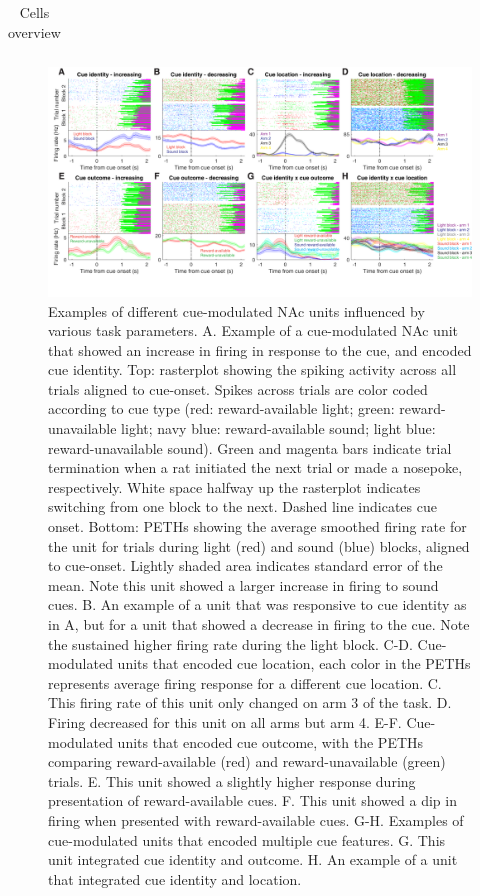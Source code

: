 \documentclass[11pt]{article}
\begin{document}
\begin{table}[p]
\begin{tabular}{l c  c c c c}
\end{tabular}
\caption {Cells overview} \label{tbl1} 
\end{table}

\begin{figure}[h]
\centering
\includegraphics[width=\textwidth]{Fig 5 - Neural examples.png}
\caption{Examples of different cue-modulated NAc units influenced by various task parameters. A. Example of a cue-modulated NAc unit that showed an increase in firing in response to the cue, and encoded cue identity. Top: rasterplot showing the spiking activity across all trials aligned to cue-onset. Spikes across trials are color coded according to cue type (red: reward-available light; green: reward-unavailable light; navy blue: reward-available sound; light blue: reward-unavailable sound). Green and magenta bars indicate trial termination when a rat initiated the next trial or made a nosepoke, respectively. White space halfway up the rasterplot indicates switching from one block to the next. Dashed line indicates cue onset. Bottom: PETHs showing the average smoothed firing rate for the unit for trials during light (red) and sound (blue) blocks, aligned to cue-onset. Lightly shaded area indicates standard error of the mean. Note this unit showed a larger increase in firing to sound cues. B. An example of a unit that was responsive to cue identity as in A, but for a unit that showed a decrease in firing to the cue. Note the sustained higher firing rate during the light block. C-D. Cue-modulated units that encoded cue location, each color in the PETHs represents average firing response for a different cue location. C. This firing rate of this unit only changed on arm 3 of the task. D. Firing decreased for this unit on all arms but arm 4. E-F. Cue-modulated units that encoded cue outcome, with the PETHs comparing reward-available (red) and reward-unavailable (green) trials. E. This unit showed a slightly higher response during presentation of reward-available cues. F. This unit showed a dip in firing when presented with reward-available cues. G-H. Examples of cue-modulated units that encoded multiple cue features. G. This unit integrated cue identity and outcome. H. An example of a unit that integrated cue identity and location.}
\label{fig:examples}
\end{figure}
\end{document}

